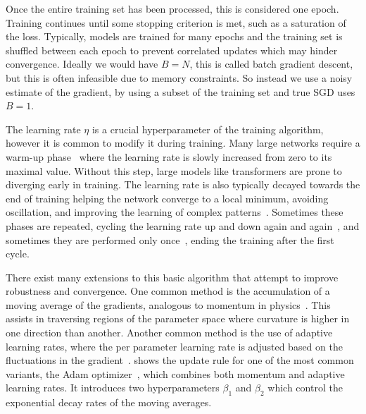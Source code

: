 Once the entire training set has been processed, this is considered one epoch.
Training continues until some stopping criterion is met, such as a saturation of the loss.
Typically, models are trained for many epochs and the training set is shuffled between each epoch to prevent correlated updates which may hinder convergence.
Ideally we would have $B=N$, this is called batch gradient descent, but this is often infeasible due to memory constraints.
So instead we use a noisy estimate of the gradient, by using a subset of the training set and true SGD uses $B=1$.

The learning rate $\eta$ is a crucial hyperparameter of the training algorithm, however it is common to modify it during training.
Many large networks require a warm-up phase~\cite{SGDRStochasticGradient} where the learning rate is slowly increased from zero to its maximal value.
Without this step, large models like transformers are prone to diverging early in training.
The learning rate is also typically decayed towards the end of training helping the network converge to a local minimum, avoiding oscillation, and improving the learning of complex patterns~\cite{HowDoesLearning}.
Sometimes these phases are repeated, cycling the learning rate up and down again and again~\cite{CyclicalLearningRates}, and sometimes they are performed only once~\cite{SuperConvergenceVeryFast}, ending the training after the first cycle.

There exist many extensions to this basic algorithm that attempt to improve robustness and convergence.
One common method is the accumulation of a moving average of the gradients, analogous to momentum in physics~\cite{Momentum}.
This assists in traversing regions of the parameter space where curvature is higher in one direction than another.
Another common method is the use of adaptive learning rates, where the per parameter learning rate is adjusted based on the fluctuations in the gradient~\cite{Adagrad, RMSProp}.
 shows the update rule for one of the most common variants, the Adam optimizer~\cite{Adam}, which combines both momentum and adaptive learning rates.
It introduces two hyperparameters $\beta_1$ and $\beta_2$ which control the exponential decay rates of the moving averages.

